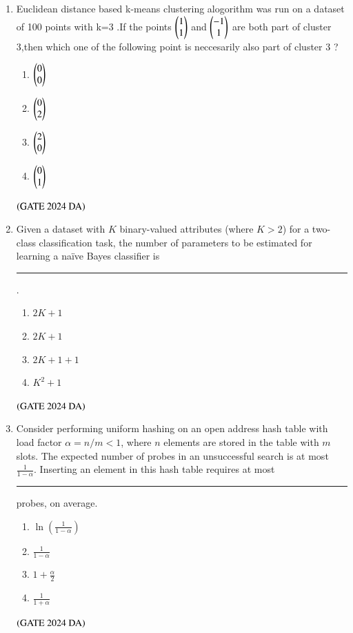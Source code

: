 \documentclass[journal,12pt,onecolumn]{IEEEtran}
\theoremstyle{remark}
\begin{document}
\begin{enumerate}[resume]
\item Euclidean distance based k-means clustering alogorithm was run on a dataset of 100 points with k=3 .If the points $\begin{pmatrix}1 \\ 1\end{pmatrix}$ and $\begin{pmatrix}-1 \\ 1\end{pmatrix}$ are both part of cluster 3,then which one of the following point is neccesarily also part of cluster 3 ?
\begin{multicols}{4}
\begin{enumerate}
\item $\begin{pmatrix}0 \\ 0\end{pmatrix}$
\item $\begin{pmatrix}0 \\ 2\end{pmatrix}$
\item $\begin{pmatrix}2 \\ 0\end{pmatrix}$
\item $\begin{pmatrix}0 \\ 1\end{pmatrix}$
\end{enumerate}
\end{multicols}
\hfill $\left(\text{GATE 2024 DA}\right)$


\item Given a dataset with $K$ binary-valued attributes (where $K > 2$) for a two-class classification task, the number of parameters to be estimated for learning a naïve Bayes classifier is  \rule{2cm}{0.5mm}.
\begin{multicols}{4}
\begin{enumerate}
\item $2K + 1$
\item $2K + 1$
\item $2K+1 + 1$
\item $K^2 + 1$
\end{enumerate}
\end{multicols}
\hfill $\left(\text{GATE 2024 DA}\right)$


\item Consider performing uniform hashing on an open address hash table with load factor $\alpha = n/m < 1$, where $n$ elements are stored in the table with $m$ slots. The expected number of probes in an unsuccessful search is at most $\frac{1}{1-\alpha}$. Inserting an element in this hash table requires at most  \rule{2cm}{0.5mm} probes, on average.
\begin{multicols}{4}
\begin{enumerate}
\item $\ln ( \frac{1}{1-\alpha} )$
\item $\frac{1}{1 - \alpha}$
\item $1 + \frac{\alpha}{2}$
\item $\frac{1}{1 + \alpha}$
\end{enumerate}
\end{multicols}
\hfill $\left(\text{GATE 2024 DA}\right)$



\end{enumerate}
\end{document}
